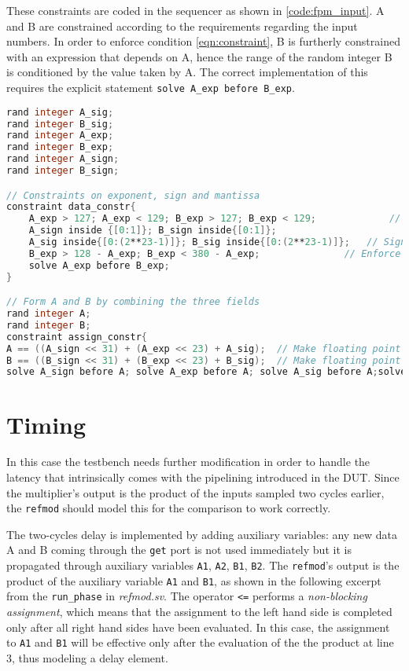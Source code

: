 These constraints are coded in the sequencer as shown in \ref{code:fpm_input}. A and B are constrained according to the requirements regarding the input numbers. In order to enforce condition \ref{eqn:constraint}, B is furtherly constrained with an expression that depends on A, hence the range of the random integer B is conditioned by the value taken by A. The correct implementation of this requires the explicit statement \texttt{solve A\_exp before B\_exp}.

\begin{lstlisting}[language = verilog, label = code:fpm_input, caption=\textit{packet\_in.sv}]
rand integer A_sig;
rand integer B_sig;
rand integer A_exp;
rand integer B_exp;
rand integer A_sign;
rand integer B_sign;

// Constraints on exponent, sign and mantissa
constraint data_constr{
	A_exp > 127; A_exp < 129; B_exp > 127; B_exp < 129; 		    // Exponent
	A_sign inside {[0:1]}; B_sign inside{[0:1]}; 					 			// Sign
	A_sig inside{[0:(2**23-1)]}; B_sig inside{[0:(2**23-1)]}; 	// Significand
	B_exp > 128 - A_exp; B_exp < 380 - A_exp;  				// Enforce condition on sum of exponents
	solve A_exp before B_exp;
}

// Form A and B by combining the three fields
rand integer A;
rand integer B;
constraint assign_constr{
A == ((A_sign << 31) + (A_exp << 23) + A_sig);  // Make floating point number A
B == ((B_sign << 31) + (B_exp << 23) + B_sig);  // Make floating point number B
solve A_sign before A; solve A_exp before A; solve A_sig before A;solve B_sign before B; solve B_exp before B;solve B_sig before B;}
\end{lstlisting}


\section{Timing}
In this case the testbench needs further modification in order to handle the latency that intrinsically comes with the pipelining introduced in the DUT. Since the multiplier's output is the product of the inputs sampled two cycles earlier, the \texttt{refmod} should model this for the comparison to work correctly.

The two-cycles delay is implemented by adding auxiliary variables: any new data A and B coming through the \texttt{get} port is not used immediately but it is propagated through auxiliary variables \texttt{A1}, \texttt{A2}, \texttt{B1}, \texttt{B2}. The \texttt{refmod}'s output is the product of the auxiliary variable \texttt{A1} and \texttt{B1}, as shown in the following excerpt from the \texttt{run\_phase} in \textit{refmod.sv}. The operator \texttt{<=} performs a \textit{non-blocking assignment}, which means that the assignment to the left hand side is completed only after all right hand sides have been evaluated. In this case, the assignment to \texttt{A1} and \texttt{B1} will be effective only after the evaluation of the the product at line 3, thus modeling a delay element.

